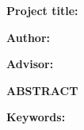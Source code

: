 \clearpage
\thispagestyle{plain}
\noindent\textbf{Project title:} \Field[9cm]{\ReportTitleEN}\par
\noindent\textbf{Author:} \Field[9cm]{\StudentNameEN}\par
\noindent\textbf{Advisor:} \Field[9cm]{\AdvisorNameEN}\par
\vspace{24pt}
\begin{center}
  \fontsize{18}{22}\selectfont\bfseries ABSTRACT
\end{center}
\BlankBody[9cm]
\noindent\textbf{Keywords:} \BlankField[9cm]
